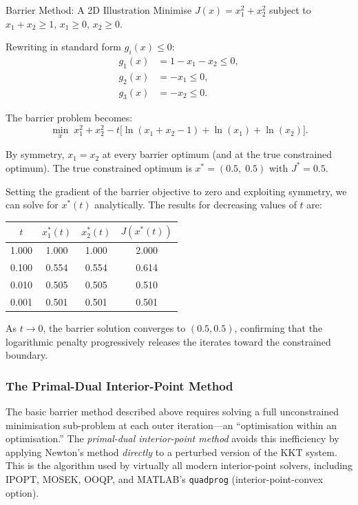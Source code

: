 \begin{examplebox}{Barrier Method: A 2D Illustration}
	Minimise $J(x) = x_1^2 + x_2^2$ subject to $x_1 + x_2 \geq 1$, $x_1 \geq 0$, $x_2 \geq 0$.

	Rewriting in standard form $g_i(x) \leq 0$:
	\begin{align*}
		g_1(x) &= 1 - x_1 - x_2 \leq 0, \\
		g_2(x) &= -x_1 \leq 0, \\
		g_3(x) &= -x_2 \leq 0.
	\end{align*}

	The barrier problem becomes:
	\[
		\min_{x} \; x_1^2 + x_2^2 - t\bigl[\ln(x_1 + x_2 - 1) + \ln(x_1) + \ln(x_2)\bigr].
	\]

	\solution

	By symmetry, $x_1 = x_2$ at every barrier optimum (and at the true constrained optimum). The true constrained optimum is $x^* = (0.5,\; 0.5)$ with $J^* = 0.5$.

	Setting the gradient of the barrier objective to zero and exploiting symmetry, we can solve for $x^*(t)$ analytically. The results for decreasing values of $t$ are:

	\begin{center}
	\begin{tabular}{cccc}
		\toprule
		$t$ & $x_1^*(t)$ & $x_2^*(t)$ & $J(x^*(t))$ \\
		\midrule
		1.000 & 1.000 & 1.000 & 2.000 \\
		0.100 & 0.554 & 0.554 & 0.614 \\
		0.010 & 0.505 & 0.505 & 0.510 \\
		0.001 & 0.501 & 0.501 & 0.501 \\
		\bottomrule
	\end{tabular}
	\end{center}

	As $t \to 0$, the barrier solution converges to $(0.5, 0.5)$, confirming that the logarithmic penalty progressively releases the iterates toward the constrained boundary.
\end{examplebox}

\subsubsection{The Primal-Dual Interior-Point Method}

The basic barrier method described above requires solving a full unconstrained minimisation sub-problem at each outer iteration---an ``optimisation within an optimisation.'' The \emph{primal-dual interior-point method} avoids this inefficiency by applying Newton's method \emph{directly} to a perturbed version of the KKT system. This is the algorithm used by virtually all modern interior-point solvers, including IPOPT, MOSEK, OOQP, and MATLAB's \texttt{quadprog} (interior-point-convex option).

